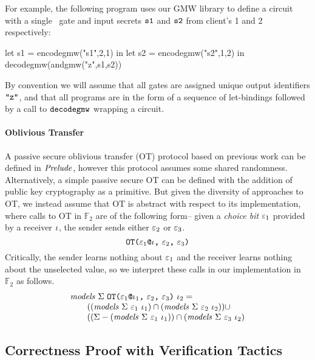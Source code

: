 For example, the following program uses our GMW library to define
a circuit with a single \eand\ gate and input secrets $\texttt{s1}$ and
$\texttt{s2}$ from client's 1 and 2 respectively:
\begin{verbatimtab}
         let s1 = encodegmw("s1",2,1) in
         let s2 = encodegmw("s2",1,2) in
         decodegmw(andgmw("z",s1,s2))
\end{verbatimtab}
By convention we will assume that all gates are assigned unique output
identifiers $\texttt{"z"}$, and that all programs are in the form
of a sequence of let-bindings followed by a call to $\texttt{decodegmw}$
wrapping a circuit.

\paragraph{Oblivious Transfer} A passive secure oblivious transfer (OT) protocol
based on previous work \cite{barthe2019probabilistic} can be defined in $\mathit{Prelude}$,
however this protocol assumes some shared randomness. Alternatively,
a simple passive secure OT can be defined with the addition of
public key cryptography as a primitive. But given the diversity
of approaches to OT, we instead assume that OT is abstract with
respect to its implementation, where calls to OT in $\mathbb{F}_2$
are of the following form-- given a \emph{choice bit}
$\varepsilon_1$ provided by a receiver $\iota$, the sender
sends either $\varepsilon_2$ or $\varepsilon_3$.
$$
\texttt{OT(} \varepsilon_1\texttt{@}\iota \texttt{,}\ \varepsilon_2 \texttt{,}\ \varepsilon_3 \texttt{)}
$$
Critically, the sender learns nothing about $\varepsilon_1$ and the
receiver learns nothing about the unselected value, so we interpret
these calls in our implementation in $\mathbb{F}_2$ as follows.
$$
\begin{array}{l}
\mathit{models}\ \Sigma\ \texttt{OT(} \varepsilon_1\texttt{@}\iota_1 \texttt{,}\ \varepsilon_2 \texttt{,}\ \varepsilon_3 \texttt{)}\ \iota_2 = \\
\qquad ((\mathit{models}\ \Sigma\ \varepsilon_1\ \iota_1) \cap 
(\mathit{models}\ \Sigma\ \varepsilon_2\ \iota_2)) \cup \\
\qquad ((\Sigma - (\mathit{models}\ \Sigma\ \varepsilon_1\ \iota_1)) \cap
(\mathit{models}\ \Sigma\ \varepsilon_3\ \iota_2)
\end{array}
$$

\subsection{Correctness Proof with Verification Tactics}

